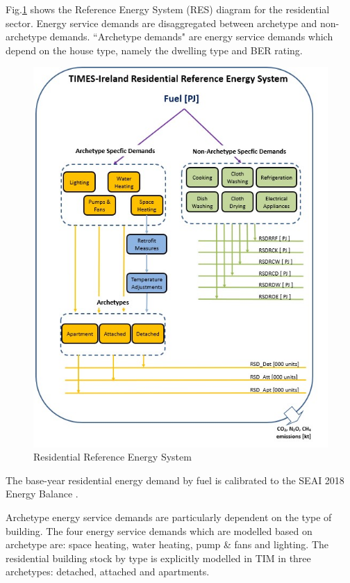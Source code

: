 \documentclass[journal abbreviation, manuscript]{copernicus}
\begin{document}
Fig.\ref{fig:TIM_RES} shows the Reference Energy System (RES) diagram for the residential sector. Energy service demands are disaggregated between archetype and non-archetype demands. ``Archetype demands" are energy service demands which depend on the house type, namely the dwelling type and BER rating. 
 
\begin{figure}[hb!]
 \centering
 \includegraphics[scale=3.2]{TIM_Residential_RES2.jpg} 
 \caption{Residential Reference Energy System}
 \label{fig:TIM_RES}
\end{figure}

The base-year residential energy demand by fuel is calibrated to the SEAI 2018 Energy Balance \citep{SEAI2019}.

Archetype energy service demands are particularly dependent on the type of building. The four energy service demands which are modelled based on archetype are: space heating, water heating, pump \& fans and lighting. The residential building stock by type is explicitly modelled in TIM in three archetypes: detached, attached and apartments. 
\end{document}
